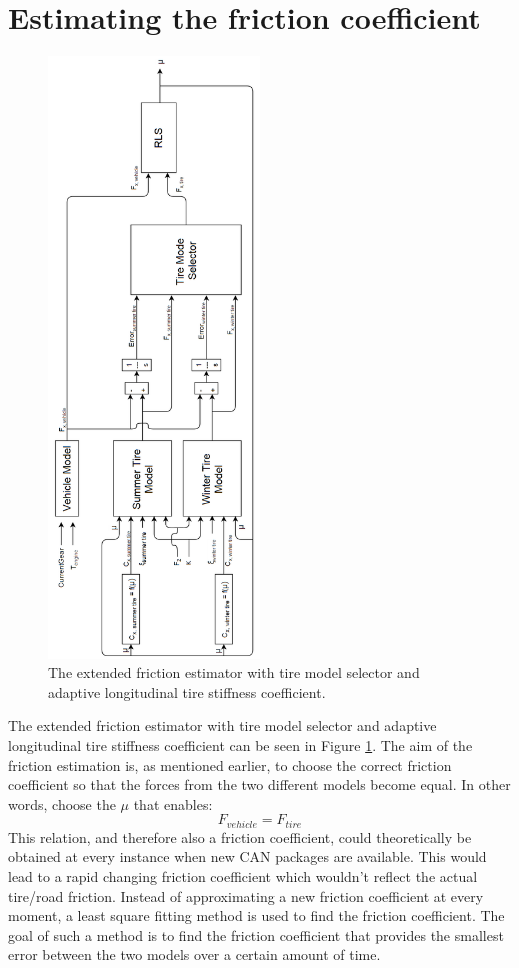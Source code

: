 \section{Estimating the friction coefficient}
\begin{figure}[!]
	\centering
	\includegraphics[width=0.5\textwidth]{Pictures/friction_estimator_ext}
	\caption {The extended friction estimator with tire model selector and adaptive longitudinal tire stiffness coefficient.}
	\label{friction_estimator_ext}
\end{figure}
The extended friction estimator with tire model selector and adaptive longitudinal tire stiffness coefficient can be seen in Figure \ref{friction_estimator_ext}. The aim of the friction estimation is, as mentioned earlier, to choose the correct friction coefficient so that the forces from the two different models become equal. In other words, choose the $ \mu $ that enables:
\begin{equation}
	F_{vehicle} = F_{tire}
\end{equation}
This relation, and therefore also a friction coefficient, could theoretically be obtained at every instance when new CAN packages are available. This would lead to a rapid changing friction coefficient which wouldn't reflect the actual tire/road friction. Instead of approximating a new friction coefficient at every moment, a least square fitting method is used to find the friction coefficient. The goal of such a method is to find the friction coefficient that provides the smallest error between the two models over a certain amount of time. 

